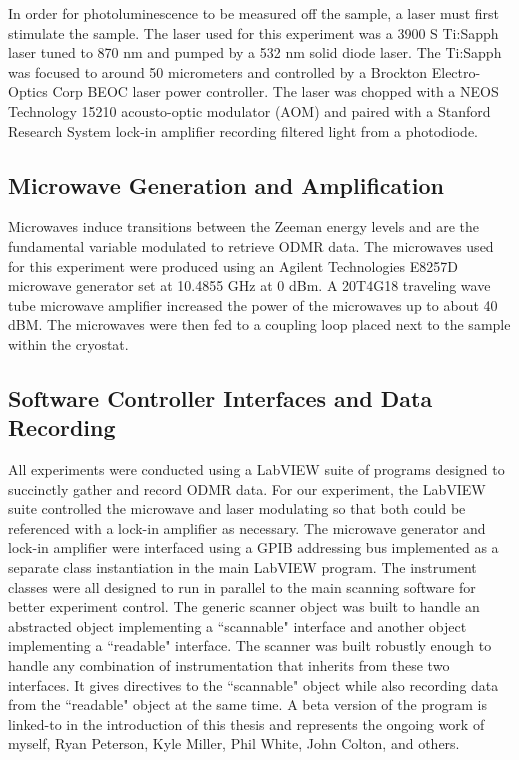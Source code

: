 \documentclass[oneside, astronomy, noacknowlegments]{BYUPhys}
\begin{document}
In order for photoluminescence to be measured off the sample, a laser must first stimulate the sample. The laser used for this experiment was a 3900 S Ti:Sapph laser tuned to 870 nm and pumped by a 532 nm solid diode laser. The Ti:Sapph was focused to around 50 micrometers and controlled by a Brockton Electro-Optics Corp BEOC laser power controller. The laser was chopped with a NEOS Technology 15210 acousto-optic modulator (AOM) and paired with a Stanford Research System lock-in amplifier recording filtered light from a photodiode.

\subsection{Microwave Generation and Amplification}

Microwaves induce transitions between the Zeeman energy levels and are the fundamental variable modulated to retrieve ODMR data. The microwaves used for this experiment were produced using an Agilent Technologies E8257D microwave generator set at 10.4855 GHz at 0 dBm. A 20T4G18 traveling wave tube microwave amplifier increased the power of the microwaves up to about 40 dBM. The microwaves were then fed to a coupling loop placed next to the sample within the cryostat.

\subsection{Software Controller Interfaces and Data Recording}

All experiments were conducted using a LabVIEW suite of programs designed to succinctly gather and record ODMR data. For our experiment, the LabVIEW suite controlled the microwave and laser modulating so that both could be referenced with a lock-in amplifier as necessary. The microwave generator and lock-in amplifier were interfaced using a GPIB addressing bus implemented as a separate class instantiation in the main LabVIEW program. The instrument classes were all designed to run in parallel to the main scanning software for better experiment control. The generic scanner object was built to handle an abstracted object implementing a ``scannable" interface and another object implementing a ``readable" interface. The scanner was built robustly enough to handle any combination of instrumentation that inherits from these two interfaces. It gives directives to the ``scannable" object while also recording data from the ``readable" object at the same time. A beta version of the program is linked-to in the introduction of this thesis and represents the ongoing work of myself, Ryan Peterson, Kyle Miller, Phil White, John Colton, and others.
\end{document}
